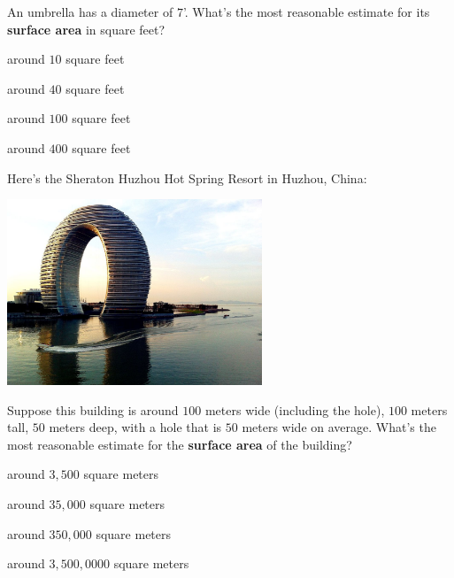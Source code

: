 \documentclass[noauthor,nooutcomes]{ximera}
\author{Bart Snapp}
\begin{document}
\maketitle


\begin{exercise}
  An umbrella has a diameter of $7$'.  What's the most reasonable
  estimate for its \textbf{surface area} in square feet?
  \begin{enumerate}\begin{multicols}{2}
    \item around $10$ square feet
    \item around $40$ square feet
    \item around $100$ square feet
    \item around $400$ square feet
    \end{multicols}
  \end{enumerate}
\end{exercise}



\begin{exercise}%
  Here's the Sheraton Huzhou Hot Spring Resort in Huzhou, China:
  \begin{center}
    \includegraphics[width=3in]{SheratonHuzhou.jpg}
  \end{center}  
  Suppose this building is around $100$ meters wide (including the
  hole), $100$ meters tall, $50$ meters deep, with a hole that is $50$
  meters wide on average. What's the most reasonable estimate for the
  \textbf{surface area} of the building?
    \begin{enumerate}\begin{multicols}{2}
    \item around $3,500$ square meters
    \item around $35,000$ square meters %
    \item around $350,000$ square meters
    \item around $3,500,0000$ square meters
    \end{multicols}
  \end{enumerate}
\end{exercise}
\end{document}
